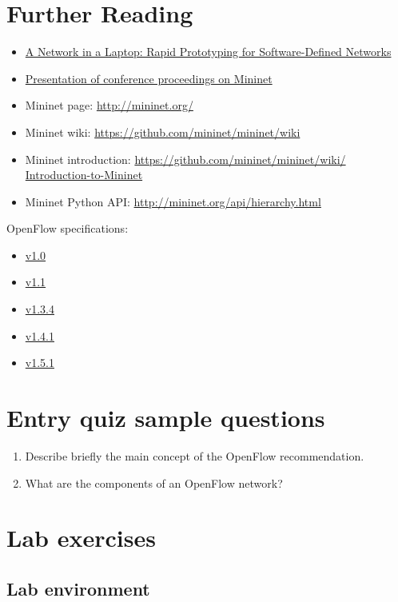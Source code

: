 \documentclass[a4paper]{article}
\begin{document}
\section{Further Reading}

\begin{itemize}
    \item \href{https://qosip.tmit.bme.hu/foswiki/pub/Meres/OpenFlowMScMeresiSegedlet/a19-lantz.pdf}{A Network in a
              Laptop: Rapid Prototyping for Software-Defined Networks}
    \item

          \href{https://qosip.tmit.bme.hu/foswiki/pub/Meres/OpenFlowMScMeresiSegedlet/mininet-hotnets2010-final.pdf}{Presentation
              of conference proceedings on Mininet}
    \item	Mininet page: \url{http://mininet.org/}
    \item	Mininet wiki: \url{https://github.com/mininet/mininet/wiki}
    \item	Mininet introduction: \url{https://github.com/mininet/mininet/wiki/  Introduction-to-Mininet}
    \item	Mininet Python API: \url{http://mininet.org/api/hierarchy.html}
\end{itemize}

OpenFlow specifications:
\begin{itemize}
    \item
          \href{https://qosip.tmit.bme.hu/foswiki/pub/Meres/OpenFlowMScMeresiSegedlet/openflow-spec-v1.0.0.pdf}{v1.0}
    \item
          \href{https://qosip.tmit.bme.hu/foswiki/pub/Meres/OpenFlowMScMeresiSegedlet/openflow-spec-v1.1.0.pdf}{v1.1}
    \item

          \href{https://qosip.tmit.bme.hu/foswiki/pub/Meres/OpenFlowMScMeresiSegedlet/openflow-switch-v1.3.4.pdf}{v1.3.4}
    \item

          \href{https://qosip.tmit.bme.hu/foswiki/pub/Meres/OpenFlowMScMeresiSegedlet/openflow-switch-v1.4.1.pdf}{v1.4.1}
    \item

          \href{https://qosip.tmit.bme.hu/foswiki/pub/Meres/OpenFlowMScMeresiSegedlet/openflow-switch-v1.5.1.pdf}{v1.5.1}

\end{itemize}

\appendix

\section{Entry quiz sample questions}

\begin{enumerate}
    \item Describe briefly the main concept of the OpenFlow recommendation.
    \item What are the components of an OpenFlow network?
\end{enumerate}

\section{Lab exercises}

\subsection{Lab environment}
\end{document}
